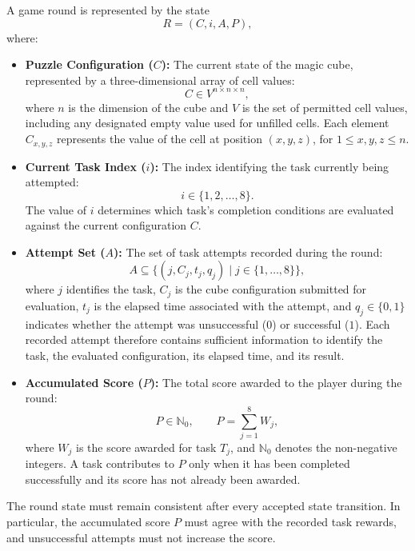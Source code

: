 \documentclass[12pt]{article}
\begin{document}
A game round is represented by the state
\[
    R = (C, i, A, P),
\]
where:
\begin{itemize}
    \item \textbf{Puzzle Configuration (\(C\)):}
    The current state of the magic cube, represented by a
    three-dimensional array of cell values:
    \[
        C \in V^{n \times n \times n},
    \]
    where \(n\) is the dimension of the cube and \(V\) is the
    set of permitted cell values, including any designated
    empty value used for unfilled cells. Each element
    \(C_{x,y,z}\) represents the value of the cell at position
    \((x,y,z)\), for \(1 \leq x,y,z \leq n\).

    \item \textbf{Current Task Index (\(i\)):}
    The index identifying the task currently being attempted:
    \[
        i \in \{1,2,\ldots,8\}.
    \]
    The value of \(i\) determines which task's completion
    conditions are evaluated against the current configuration
    \(C\).

    \item \textbf{Attempt Set (\(A\)):}
    The set of task attempts recorded during the round:
    \[
        A \subseteq
        \{(j,C_j,t_j,q_j) \mid
        j \in \{1,\ldots,8\}\},
    \]
    where \(j\) identifies the task, \(C_j\) is the cube
    configuration submitted for evaluation, \(t_j\) is the
    elapsed time associated with the attempt, and
    \(q_j \in \{0,1\}\) indicates whether the attempt was
    unsuccessful (\(0\)) or successful (\(1\)).
    Each recorded attempt therefore contains sufficient
    information to identify the task, the evaluated
    configuration, its elapsed time, and its result.

    \item \textbf{Accumulated Score (\(P\)):}
    The total score awarded to the player during the round:
    \[
        P \in \mathbb{N}_0,
        \qquad
        P = \sum_{j=1}^{8} W_j,
    \]
    where \(W_j\) is the score awarded for task \(T_j\), and
    \(\mathbb{N}_0\) denotes the non-negative integers.
    A task contributes to \(P\) only when it has been completed
    successfully and its score has not already been awarded.
\end{itemize}

The round state must remain consistent after every accepted
state transition. In particular, the accumulated score \(P\)
must agree with the recorded task rewards, and unsuccessful
attempts must not increase the score.
\end{document}
